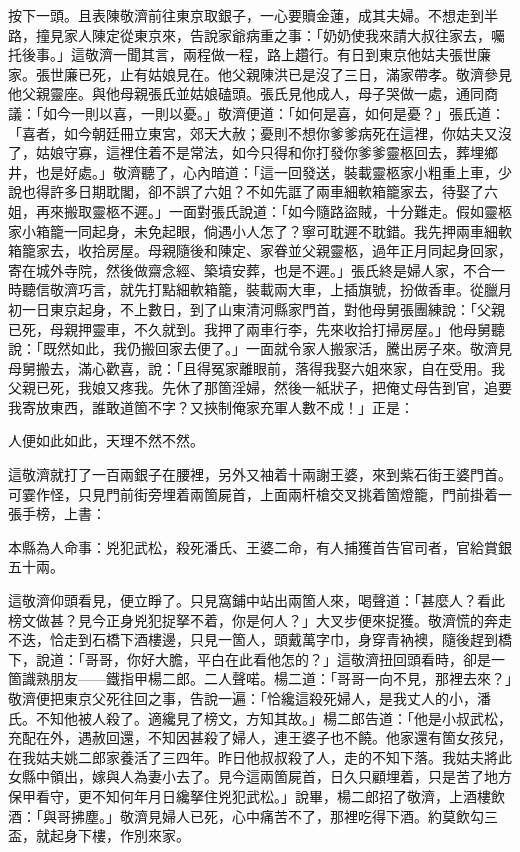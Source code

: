 按下一頭。且表陳敬濟前往東京取銀子，一心要贖金蓮，成其夫婦。不想走到半路，撞見家人陳定從東京來，告說家爺病重之事：「奶奶使我來請大叔往家去，囑托後事。」這敬濟一聞其言，兩程做一程，路上趲行。有日到東京他姑夫張世廉家。張世廉已死，止有姑娘見在。他父親陳洪已是沒了三日，滿家帶孝。敬濟參見他父親靈座。與他母親張氏並姑娘磕頭。張氏見他成人，母子哭做一處，通同商議：「如今一則以喜，一則以憂。」{}敬濟便道：「如何是喜，如何是憂？」張氏道：「喜者，如今朝廷冊立東宮，郊天大赦；憂則不想你爹爹病死在這裡，你姑夫又沒了，姑娘守寡，這裡住着不是常法，如今只得和你打發你爹爹靈柩回去，葬埋鄉井，也是好處。」敬濟聽了，心內暗道：「這一回發送，裝載靈柩家小粗重上車，少說也得許多日期耽閣，卻不誤了六姐？{}不如先誆了兩車細軟箱籠家去，待娶了六姐，再來搬取靈柩不遲。」一面對張氏說道：「如今隨路盜賊，十分難走。假如靈柩家小箱籠一同起身，未免起眼，倘遇小人怎了？寧可耽遲不耽錯。我先押兩車細軟箱籠家去，收拾房屋。母親隨後和陳定、家眷並父親靈柩，過年正月同起身回家，寄在城外寺院，然後做齋念經、築墳安葬，也是不遲。」張氏終是婦人家，不合一時聽信敬濟巧言，就先打點細軟箱籠，裝載兩大車，上插旗號，扮做香車。從臘月初一日東京起身，不上數日，到了山東清河縣家門首，對他母舅張團練說：「父親已死，母親押靈車，不久就到。我押了兩車行李，先來收拾打掃房屋。」他母舅聽說：「既然如此，我仍搬回家去便了。」一面就令家人搬家活，騰出房子來。敬濟見母舅搬去，滿心歡喜，說：「且得冤家離眼前，落得我娶六姐來家，自在受用。我父親已死，我娘又疼我。先休了那箇淫婦，然後一紙狀子，把俺丈母告到官，追要我寄放東西，誰敢道箇不字？{}又挾制俺家充軍人數不成！」正是：

\begin{myquote}
人便如此如此，天理不然不然。
\end{myquote}

這敬濟就打了一百兩銀子在腰裡，另外又袖着十兩謝王婆，來到紫石街王婆門首。可霎作怪，只見門前街旁埋着兩箇屍首，上面兩杆槍交叉挑着箇燈籠，門前掛着一張手榜，上書：

\begin{myquote}[\markfont]
本縣為人命事：兇犯武松，殺死潘氏、王婆二命，有人捕獲首告官司者，官給賞銀五十兩。
\end{myquote}

這敬濟仰頭看見，便立睜了。只見窩鋪中站出兩箇人來，喝聲道：「甚麼人？看此榜文做甚？見今正身兇犯捉拏不着，你是何人？」大叉步便來捉獲。敬濟慌的奔走不迭，恰走到石橋下酒樓邊，只見一箇人，頭戴萬字巾，身穿青衲襖，隨後趕到橋下，說道：「哥哥，你好大膽，平白在此看他怎的？」這敬濟扭回頭看時，卻是一箇識熟朋友——鐵指甲楊二郎。二人聲喏。楊二道：「哥哥一向不見，那裡去來？」敬濟便把東京父死往回之事，告說一遍：「恰纔這殺死婦人，是我丈人的小，潘氏。不知他被人殺了。適纔見了榜文，方知其故。」楊二郎告道：「他是小叔武松，充配在外，遇赦回還，不知因甚殺了婦人，連王婆子也不饒。他家還有箇女孩兒，在我姑夫姚二郎家養活了三四年。昨日他叔叔殺了人，走的不知下落。我姑夫將此女縣中領出，嫁與人為妻小去了。{}見今這兩箇屍首，日久只顧埋着，只是苦了地方保甲看守，更不知何年月日纔拏住兇犯武松。」說畢，楊二郎招了敬濟，上酒樓飲酒：「與哥拂塵。」敬濟見婦人已死，心中痛苦不了，那裡吃得下酒。約莫飲勾三盃，就起身下樓，作別來家。

